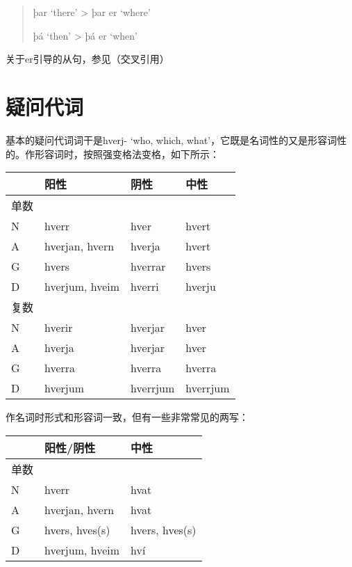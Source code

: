 \begin{quote}
  þar `there‌' \textgreater{} þar er `where‌'

  þá `then‌' \textgreater{} þá er `when‌'
\end{quote}

关于er引导的从句，参见（交叉引用）

\section{疑问代词}\label{疑问代词}

基本的疑问代词词干是hverj- `who, which,
what‌'，它既是名词性的又是形容词性的。作形容词时，按照强变格法变格，如下所示：

\begin{longtable}{llll}
  \toprule
     & 阳性             & 阴性       & 中性       \\
  \midrule
  \endhead
  \bottomrule
  \endfoot
  单数 &                &          &          \\
  N  & hverr          & hver     & hvert    \\
  A  & hverjan, hvern & hverja   & hvert    \\
  G  & hvers          & hverrar  & hvers    \\
  D  & hverjum, hveim & hverri   & hverju   \\
  复数 &                &          &          \\
  N  & hverir         & hverjar  & hver     \\
  A  & hverja         & hverjar  & hver     \\
  G  & hverra         & hverra   & hverra   \\
  D  & hverjum        & hverrjum & hverrjum \\
\end{longtable}

作名词时形式和形容词一致，但有一些非常常见的两写：

\begin{longtable}{lll}
  \toprule
     & 阳性/阴性          & 中性             \\
  \midrule
  \endhead
  \bottomrule
  \endfoot
  单数 &                &                \\
  N  & hverr          & hvat           \\
  A  & hverjan, hvern & hvat           \\
  G  & hvers, hves(s) & hvers, hves(s) \\
  D  & hverjum, hveim & hví            \\
\end{longtable}

